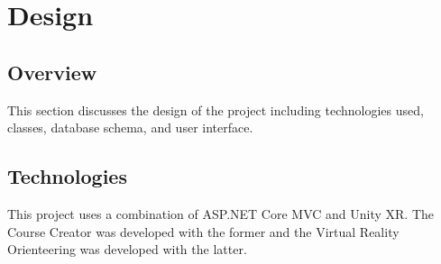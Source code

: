 \section{Design}
\label{sec:Design}

\subsection{Overview} 
This section discusses the design of the project including technologies used, classes, database schema, and user interface.

\subsection{Technologies}
This project uses a combination of ASP.NET Core MVC and Unity XR. The Course Creator was developed with the former and the Virtual Reality Orienteering was developed with the latter.

